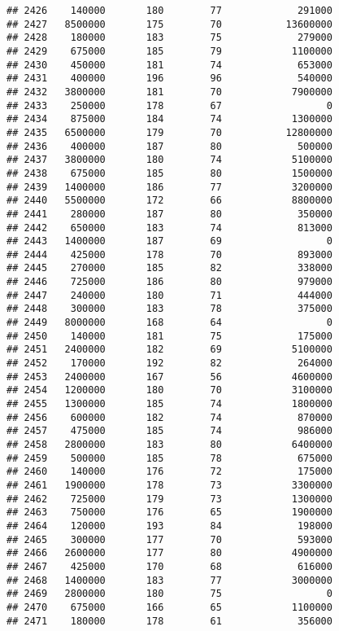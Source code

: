 \documentclass[
]{article}
\begin{document}
\begin{verbatim}
## 2426    140000       180        77             291000
## 2427   8500000       175        70           13600000
## 2428    180000       183        75             279000
## 2429    675000       185        79            1100000
## 2430    450000       181        74             653000
## 2431    400000       196        96             540000
## 2432   3800000       181        70            7900000
## 2433    250000       178        67                  0
## 2434    875000       184        74            1300000
## 2435   6500000       179        70           12800000
## 2436    400000       187        80             500000
## 2437   3800000       180        74            5100000
## 2438    675000       185        80            1500000
## 2439   1400000       186        77            3200000
## 2440   5500000       172        66            8800000
## 2441    280000       187        80             350000
## 2442    650000       183        74             813000
## 2443   1400000       187        69                  0
## 2444    425000       178        70             893000
## 2445    270000       185        82             338000
## 2446    725000       186        80             979000
## 2447    240000       180        71             444000
## 2448    300000       183        78             375000
## 2449   8000000       168        64                  0
## 2450    140000       181        75             175000
## 2451   2400000       182        69            5100000
## 2452    170000       192        82             264000
## 2453   2400000       167        56            4600000
## 2454   1200000       180        70            3100000
## 2455   1300000       185        74            1800000
## 2456    600000       182        74             870000
## 2457    475000       185        74             986000
## 2458   2800000       183        80            6400000
## 2459    500000       185        78             675000
## 2460    140000       176        72             175000
## 2461   1900000       178        73            3300000
## 2462    725000       179        73            1300000
## 2463    750000       176        65            1900000
## 2464    120000       193        84             198000
## 2465    300000       177        70             593000
## 2466   2600000       177        80            4900000
## 2467    425000       170        68             616000
## 2468   1400000       183        77            3000000
## 2469   2800000       180        75                  0
## 2470    675000       166        65            1100000
## 2471    180000       178        61             356000

\end{verbatim}
\end{document}
